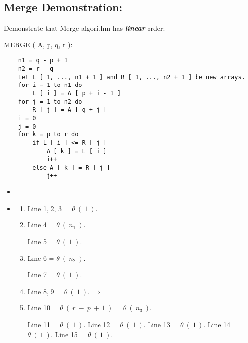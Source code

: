 \subsection{Merge Demonstration:}

Demonstrate that Merge algorithm has {\bfseries\itshape linear} order:  \hfill \break

{{\bfseries\color{Violet}{function}} MERGE ( A, p, q, r ):
\begin{lstlisting}
	n1 = q - p + 1
	n2 = r - q
	Let L [ 1, ..., n1 + 1 ] and R [ 1, ..., n2 + 1 ] be new arrays.
	for i = 1 to n1 do
		L [ i ] = A [ p + i - 1 ]
	for j = 1 to n2 do 
		R [ j ] = A [ q + j ]
	i = 0
	j = 0
	for k = p to r do
		if L [ i ] <= R [ j ]
			A [ k ] = L [ i ]
			i++
		else A [ k ] = R [ j ]
			j++
\end{lstlisting} \hfill

\begin{itemize}
\item {\bfseries\itshape\color{Maroon}{Demonstration:}} 
\end{itemize} 

\begin{multicols}{2}
\begin{itemize}
\item {\bfseries\itshape\color{Violet}{Analyzing the complexity of each line:}}
\begin{enumerate}
\item Line 1, 2, 3 = $\theta\ (\ 1\ )$.
\item Line 4 = $\theta\ (\ n_{1}\ )$.
\begin{tasks}
\task Line 5 = $\theta\ (\ 1\ )$.
\end{tasks}
\item Line 6 = $\theta\ (\ n_{2}\ )$.  
\begin{tasks}
\task Line 7 = $\theta\ (\ 1\ )$.
\end{tasks}
\item Line 8, 9 = $\theta\ (\ 1\ )$. {\Large\hspace{3.5cm}$\Longrightarrow$}
\item Line 10 = $\theta\ (\ r\ -\ p\ +\ 1\ )$ = $\theta\ (\ n_{3}\ )$.
\begin{tasks}
\task Line 11 = $\theta\ (\ 1\ )$.
\task Line 12 = $\theta\ (\ 1\ )$.
\task Line 13 = $\theta\ (\ 1\ )$.
\task Line 14 = $\theta\ (\ 1\ )$.
\task Line 15 = $\theta\ (\ 1\ )$.
\end{tasks}
\end{enumerate}
\hfill \break \break \break \break \break


\end{itemize}
\end{multicols}}
